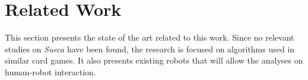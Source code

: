 \section{Related Work} \label{sec:related-work}

This section presents the state of the art related to this work.
Since no relevant studies on \emph{Sueca} have been found, the research is focused on algorithms used in similar card games.
It also presents existing robots that will allow the analyses on human-robot interaction.



